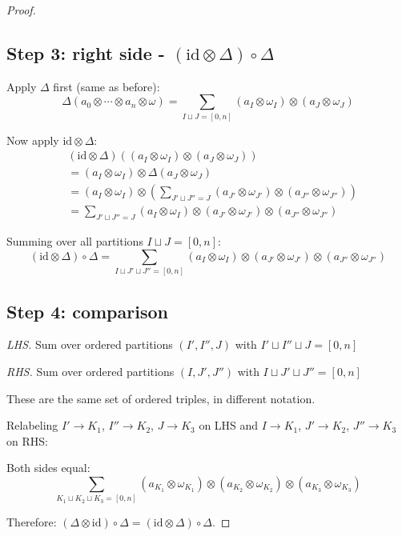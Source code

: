 \begin{proof}
\subsection*{Step 3: right side - $(\text{id} \otimes \Delta) \circ \Delta$}

Apply $\Delta$ first (same as before):
\[\Delta(a_0 \otimes \cdots \otimes a_n \otimes \omega) = \sum_{I \sqcup J = [0,n]} (a_I \otimes \omega_I) \otimes (a_J \otimes \omega_J)\]

Now apply $\text{id} \otimes \Delta$:
\begin{align*}
&(\text{id} \otimes \Delta)\left((a_I \otimes \omega_I) \otimes (a_J \otimes \omega_J)\right) \\
&= (a_I \otimes \omega_I) \otimes \Delta(a_J \otimes \omega_J) \\
&= (a_I \otimes \omega_I) \otimes \left(\sum_{J' \sqcup J'' = J} (a_{J'} \otimes \omega_{J'}) \otimes (a_{J''} \otimes \omega_{J''})\right) \\
&= \sum_{J' \sqcup J'' = J} (a_I \otimes \omega_I) \otimes (a_{J'} \otimes \omega_{J'}) \otimes (a_{J''} \otimes \omega_{J''})
\end{align*}

Summing over all partitions $I \sqcup J = [0,n]$:
\[(\text{id} \otimes \Delta) \circ \Delta = \sum_{I \sqcup J' \sqcup J'' = [0,n]} (a_I \otimes \omega_I) \otimes (a_{J'} \otimes \omega_{J'}) \otimes (a_{J''} \otimes \omega_{J''})\]

\subsection*{Step 4: comparison}

\emph{LHS.} Sum over ordered partitions $(I', I'', J)$ with $I' \sqcup I'' \sqcup J = [0,n]$

\emph{RHS.} Sum over ordered partitions $(I, J', J'')$ with $I \sqcup J' \sqcup J'' = [0,n]$

These are the same set of ordered triples, in different notation.

Relabeling $I' \to K_1$, $I'' \to K_2$, $J \to K_3$ on LHS and $I \to K_1$, $J' \to K_2$, $J'' \to K_3$ on RHS:

Both sides equal:
\[\sum_{K_1 \sqcup K_2 \sqcup K_3 = [0,n]} (a_{K_1} \otimes \omega_{K_1}) \otimes (a_{K_2} \otimes \omega_{K_2}) \otimes (a_{K_3} \otimes \omega_{K_3})\]

Therefore: $(\Delta \otimes \text{id}) \circ \Delta = (\text{id} \otimes \Delta) \circ \Delta$.
\end{proof}

